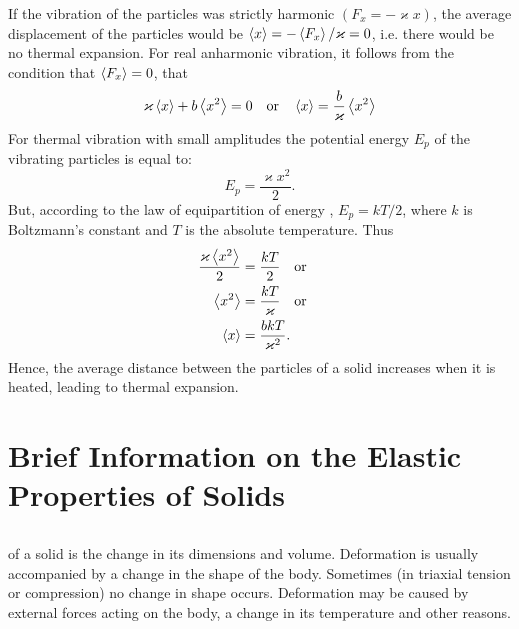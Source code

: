 If the vibration of the particles was strictly harmonic $(F_{x} = - \varkappa x)$, the average displacement of the particles would be $\expval{x} = - \expval{F_{x}}/\varkappa = 0$, i.e. there would be no thermal expansion. For real anharmonic vibration, it follows from the condition that
$\expval{F_{x}} = 0$, that
\begin{equation*}%
\varkappa \expval{x} + b \expval{x^{2}} = 0 \qor \expval{x} = \frac{b}{\varkappa} \expval{x^{2}}
\end{equation*}
For thermal vibration with small amplitudes the potential energy $E_{p}$ of the vibrating particles is equal  to:
\begin{equation*}%
E_{p} = \frac{\varkappa x^{2}}{2}.
\end{equation*}
But, according to the law of equipartition of energy , $E_{p} = kT/2$, where $k$ is Boltzmann's constant  and $T$ is the absolute temperature. Thus
\begin{align*}%
\frac{\varkappa \expval{x^{2}}}{2}  & = \frac{kT}{2} \qor \\\expval{x^{2}} & = \frac{kT}{\varkappa} \qor \\
\expval{x} & = \frac{bkT}{\varkappa^{2}}.
\end{align*}
Hence, the average distance between the particles of a solid increases when it is heated, leading to thermal expansion.

\section{Brief Information on the Elastic Properties of Solids}
\label{sec-40.3} 


\subsection{}\label{40.3.1}  of a solid is the change in its dimensions and volume. Deformation is usually accompanied by a change in the shape of the body. Sometimes (in triaxial tension or compression) no change in shape occurs. Deformation may be caused by external forces acting on the body, a change in its temperature 
and other reasons.

